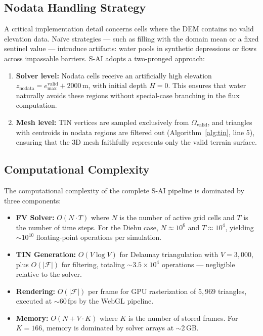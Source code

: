 \documentclass[11pt, a4paper]{article}
\begin{document}
\subsection{Nodata Handling Strategy}

A critical implementation detail concerns cells where the DEM contains no valid elevation data. Na\"ive strategies --- such as filling with the domain mean or a fixed sentinel value --- introduce artifacts: water pools in synthetic depressions or flows across impassable barriers. S-AI adopts a two-pronged approach:

\begin{enumerate}[leftmargin=1.5em]
  \item \textbf{Solver level:} Nodata cells receive an artificially high elevation $z_{\text{nodata}} = e_{\max}^{\text{valid}} + 2000$\,m, with initial depth $H = 0$. This ensures that water naturally avoids these regions without special-case branching in the flux computation.
  \item \textbf{Mesh level:} TIN vertices are sampled exclusively from $\Omega_{\text{valid}}$, and triangles with centroids in nodata regions are filtered out (Algorithm~\ref{alg:tin}, line 5), ensuring that the 3D mesh faithfully represents only the valid terrain surface.
\end{enumerate}

\subsection{Computational Complexity}

The computational complexity of the complete S-AI pipeline is dominated by three components:

\begin{itemize}[leftmargin=1.5em]
  \item \textbf{FV Solver:} $O(N \cdot T)$ where $N$ is the number of active grid cells and $T$ is the number of time steps. For the Diebu case, $N \approx 10^6$ and $T \approx 10^4$, yielding $\sim 10^{10}$ floating-point operations per simulation.
  \item \textbf{TIN Generation:} $O(V \log V)$ for Delaunay triangulation with $V = 3{,}000$, plus $O(|\mathcal{F}|)$ for filtering, totaling $\sim 3.5 \times 10^4$ operations --- negligible relative to the solver.
  \item \textbf{Rendering:} $O(|\mathcal{F}|)$ per frame for GPU rasterization of $5{,}969$ triangles, executed at $\sim$60\,fps by the WebGL pipeline.
  \item \textbf{Memory:} $O(N + V \cdot K)$ where $K$ is the number of stored frames. For $K = 166$, memory is dominated by solver arrays at $\sim$2\,GB.
\end{itemize}
\end{document}
